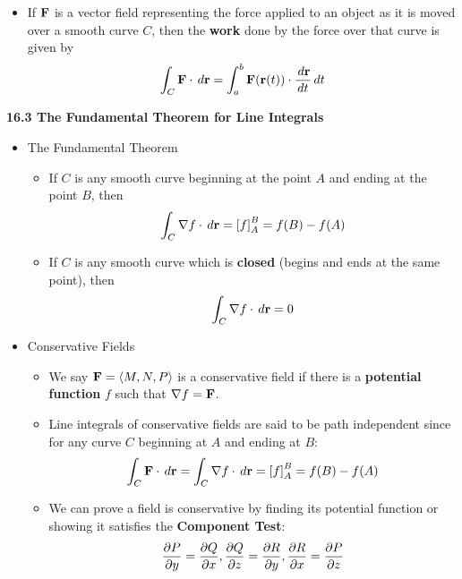 \begin{itemize}
    \begin{itemize}
      \item If $\mathbf{F}$ is a vector field representing the force applied to an object as it is moved over a smooth curve $C$, then the \textbf{work} done by the force over that curve is given by
        \[
          \int_C \mathbf{F}\cdot\,d{\mathbf{r}} = \int_a^b \mathbf{F}(\mathbf{r}(t))\cdot\frac{\,d{\mathbf{r}}}{dt}\,d{t}
        \]
    \end{itemize}
        
  
    
  \end{itemize}

\newpage

\centerline{\bf 16.3 The Fundamental Theorem for Line Integrals}

  \begin{itemize}

  \item The Fundamental Theorem
    \begin{itemize}
      \item If $C$ is any smooth curve beginning at the point $A$ and ending at the point $B$, then
        \[
          \int_C \nabla f\cdot \,d{\mathbf{r}} = \left[f\right]_A^B = f(B)-f(A)
        \]
      \item If $C$ is any smooth curve which is \textbf{closed} (begins and ends at the same point), then
        \[
          \int_C \nabla f\cdot \,d{\mathbf{r}} = 0
        \]
    \end{itemize}

  \item Conservative Fields
    \begin{itemize}
      \item We say $\mathbf{F}=\left<M,N,P\right>$ is a conservative field if there is a \textbf{potential function} $f$ such that $\nabla f = \mathbf{F}$.
      \item Line integrals of conservative fields are said to be path independent since for any curve $C$ beginning at $A$ and ending at $B$:
        \[
          \int_C \mathbf{F}\cdot \,d{\mathbf{r}} = \int_C \nabla f\cdot \,d{\mathbf{r}} = \left[f\right]_A^B = f(B)-f(A)
        \]
      \item We can prove a field is conservative by finding its potential function or showing it satisfies the \textbf{Component Test}:
        \[
          \frac{\partial P}{\partial y}=\frac{\partial Q}{\partial x}, \frac{\partial Q}{\partial z}=\frac{\partial R}{\partial y}, \frac{\partial R}{\partial x}=\frac{\partial P}{\partial z}
        \]
    \end{itemize}

  \end{itemize}
  
